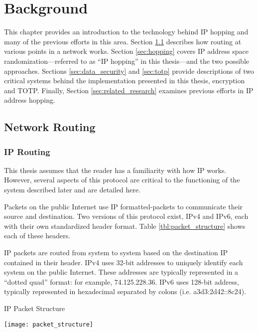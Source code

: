 \chapter{Background}
\label{chp:background}
\par This chapter provides an introduction to the technology behind \ac{IP} hopping and many of the previous efforts in this area. Section \ref{sec:routing} describes how routing at various points in a network works. Section \ref{sec:hopping} covers IP address space randomization---referred to as ``\ac{IP} hopping'' in this thesis---and the two possible approaches. Sections \ref{sec:data_security} and \ref{sec:totp} provide descriptions of two critical systems behind the implementation presented in this thesis, encryption and \ac{TOTP}. Finally, Section \ref{sec:related_research} examines previous efforts in \ac{IP} address hopping.

\section{Network Routing}
\label{sec:routing}

\subsection{\ac{IP} Routing}
\label{sec:ip_routing}
\par This thesis assumes that the reader has a familiarity with how \ac{IP} works. However, several aspects of this protocol are critical to the functioning of the system described later and are detailed here. 

\par Packets on the public Internet use \ac{IP} formatted-packets to communicate their source and destination. Two versions of this protocol exist, \ac{IPv4} and \ac{IPv6}, each with their own standardized header format. Table \ref{tbl:packet_structure} shows each of these headers.

\par \ac{IP} packets are routed from system to system based on the destination \ac{IP} contained in their header. \ac{IPv4} uses 32-bit addresses to uniquely identify each system on the public Internet. These addresses are typically represented in a ``dotted quad'' format: for example, 74.125.228.36. \ac{IPv6} uses 128-bit address, typically represented in hexadecimal separated by colons (i.e. a3d3:2d42::8c24).

\begin{landscape}
\begin{table}
\caption{\ac{IP} Packet Structure}
\label{tbl:packet_structure}
\centering
\texttt{[image: packet\_structure]}
\end{table}
\end{landscape}

